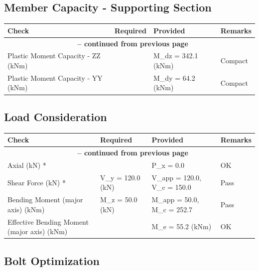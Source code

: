 \documentclass[12pt]{article}
\begin{document}
\subsection{Member Capacity - Supporting Section}

\begin{longtable}{llll}
\cellcolor{OsdagGreen} Check & \cellcolor{OsdagGreen} Required & \cellcolor{OsdagGreen} Provided & \cellcolor{OsdagGreen} Remarks \\ \hline
\endfirsthead
\multicolumn{4}{c}{{\bfseries \tablename\ \thetable{} -- continued from previous page}} \\
\endhead
\endfoot
\endlastfoot
Plastic Moment Capacity - ZZ (kNm) &  & M\_dz = 342.1 (kNm) & Compact \\
\hline
Plastic Moment Capacity - YY (kNm) &  & M\_dy = 64.2 (kNm) & Compact \\
\hline
\end{longtable}

\subsection{Load Consideration}

\begin{longtable}{llll}
\cellcolor{OsdagGreen} Check & \cellcolor{OsdagGreen} Required & \cellcolor{OsdagGreen} Provided & \cellcolor{OsdagGreen} Remarks \\ \hline
\endfirsthead
\multicolumn{4}{c}{{\bfseries \tablename\ \thetable{} -- continued from previous page}} \\
\endhead
\endfoot
\endlastfoot
Axial (kN) * &  & P\_x = 0.0 & OK \\
\hline
Shear Force (kN) * & V\_y = 120.0 (kN) & V\_app = 120.0, V\_c = 150.0 & Pass \\
\hline
Bending Moment (major axis) (kNm) & M\_z = 50.0 (kN) & M\_app = 50.0, M\_c = 252.7 & Pass \\
\hline
Effective Bending Moment (major axis) (kNm) &  & M\_e = 55.2 (kNm) & OK \\
\hline
\end{longtable}

\subsection{ Bolt Optimization}
\end{document}
